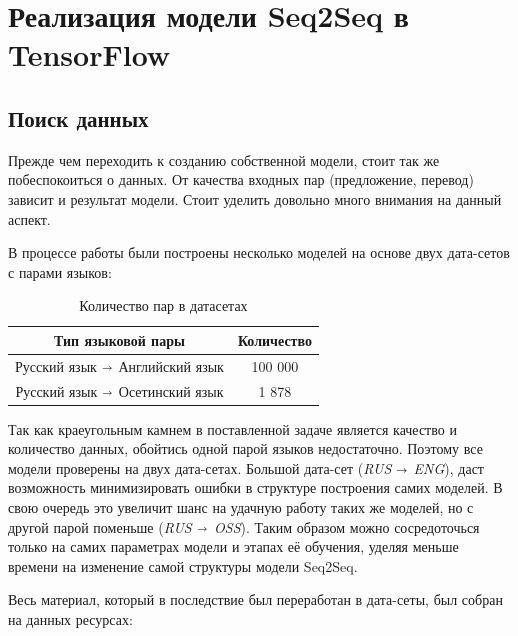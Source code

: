 	\clearpage

	\section{Реализация модели Seq2Seq в TensorFlow}
	
	\subsection{Поиск данных}
	
	Прежде чем переходить к созданию собственной модели, стоит так же побеспокоиться о данных. От качества входных пар (предложение, перевод) зависит и результат модели. Стоит уделить довольно много внимания на данный аспект.
	
	В процессе работы были построены несколько моделей на основе двух дата-сетов с парами языков:
    
    \begin{table}[h]
        \centering
        \begin{tabular}{|c|c|} 
        \hline
        \textbf{Тип языковой пары}                                       & \textbf{Количество}  \\ 
        \hline
        Русский язык $\shortrightarrow$ Английский язык & 100 000              \\ 
        \hline
        Русский язык $\shortrightarrow$ Осетинский язык & 1 878                \\
        \hline
        \end{tabular}
        \caption{Количество пар в датасетах}
    \end{table}
    
    Так как краеугольным камнем в поставленной задаче является качество и количество данных, обойтись одной парой языков недостаточно. Поэтому все модели проверены на двух дата-сетах. Большой дата-сет (\textit{RUS $\shortrightarrow$ ENG}), даст возможность минимизировать ошибки в структуре построения самих моделей. В свою очередь это увеличит шанс на удачную работу таких же моделей, но с другой парой поменьше (\textit{RUS $\shortrightarrow$ OSS}). Таким образом можно сосредоточься только на самих параметрах модели и этапах её обучения, уделяя меньше времени на изменение самой структуры модели Seq2Seq.
	
	Весь материал, который в последствие был переработан в дата-сеты, был собран на данных ресурсах: 
	
